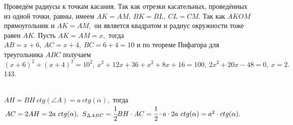 \documentclass[12pt]{article}
\begin{document}
Проведём радиусы к точкам касания. Так как отрезки касательных, проведённых из одной точки, равны, имеем $AK=AM,\ BK=BL,\ CL=CM.$ Так как $AKOM$ прямоугольник и $AK=AM,$ он является квадратом и радиус окружности тоже равен $AK.$ Пусть $AK=AM=x,$ тогда $AB=x+6,\ AC=x+4,\ BC=6+4=10$ и по теореме Пифагора для треугольника $ABC$ получаем $(x+6)^2+(x+4)^2=10^2,\ x^2+12x+36+x^2+8x+16=100,\ 2x^2+20x-48=0,\ x=2.$\\
143. \begin{figure}[ht!]
\end{figure}\\
$AH=BH\ ctg(\angle A)=a\ ctg(\alpha),$ тогда $AC=2AH=2a\ ctg(\alpha),\ S_{\Delta ABC}=\cfrac{1}{2}BH\cdot AC=\cfrac{1}{2}\cdot a \cdot2a\ ctg(\alpha)=a^2\cdot ctg(\alpha).$\newpage\noindent
\end{document}
